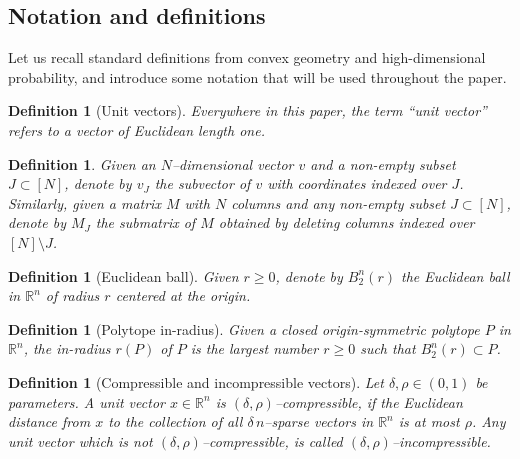 \documentclass[11pt]{amsart}
\newtheorem{definition}[theorem]{Definition}
\theoremstyle{definition}
\theoremstyle{plain}
\newcommand{\R}{\mathbb{R}}
\def\R{{\mathbb R}}
\def\Exp{{\mathbb E}}
\begin{document}
\subsection{Notation and definitions}

Let us recall standard definitions from convex geometry and high-dimensional probability,
and introduce some notation that will be used throughout the paper.

\begin{definition}[Unit vectors]
Everywhere in this paper, the term ``unit vector'' refers
to a vector of Euclidean length one.
\end{definition}

\begin{definition}\label{def:restriction}
Given an $N$--dimensional vector $v$ and a
non-empty subset $J\subset[N]$, denote by $v_J$
the subvector of $v$ with coordinates indexed over $J$.
Similarly,
given a matrix $M$ with $N$ columns and any non-empty subset $J\subset[N]$,
denote by $M_J$ the submatrix of $M$ obtained by deleting columns
indexed over $[N]\setminus J$.
\end{definition}

\begin{definition}[Euclidean ball]
Given $r\geq 0$, denote by $B_2^n(r)$
the Euclidean ball in $\R^n$ of radius $r$ centered at the origin.
\end{definition}

\begin{definition}[Polytope in-radius]
Given a closed origin-symmetric polytope $P$ in $\R^n$,
the {\it in-radius} $r(P)$ of $P$ is the largest number $r\geq 0$
such that $B_2^n(r)\subset P$.
\end{definition}

\begin{definition}[Compressible and incompressible vectors]\label{def: compincomp}
Let $\delta,\rho\in(0,1)$ be parameters. A unit vector $x\in\R^n$
is {\it $(\delta,\rho)$--compressible}, if the Euclidean distance
from $x$ to the collection of all $\delta\,n$--sparse
vectors in $\R^n$ is at most $\rho$.
Any unit vector which is not $(\delta,\rho)$--compressible,
is called {\it $(\delta,\rho)$--incompressible}.
\end{definition}

\end{document}
